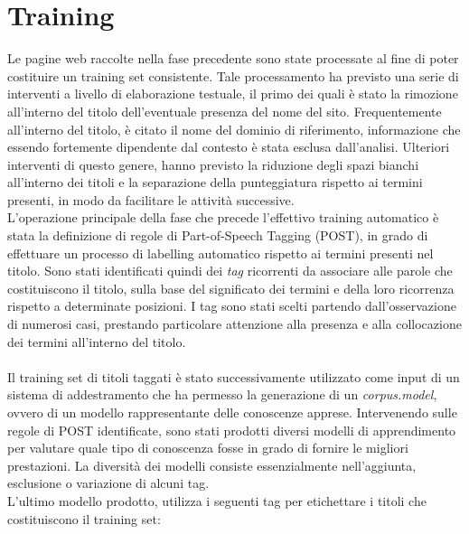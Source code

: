 \documentclass[a4paper]{report}
\begin{document}
\section{Training}
Le pagine web raccolte nella fase precedente sono state processate al fine di poter costituire un training set consistente. Tale processamento ha previsto una serie di interventi a livello di elaborazione testuale, il primo dei quali è stato la rimozione all'interno del titolo dell'eventuale presenza del nome del sito. Frequentemente all'interno del titolo, è citato il nome del dominio di riferimento, informazione che essendo fortemente dipendente dal contesto è stata esclusa dall'analisi. Ulteriori interventi di questo genere, hanno previsto la riduzione degli spazi bianchi all'interno dei titoli e la separazione della punteggiatura rispetto ai termini presenti, in modo da facilitare le attività successive. \\
L'operazione principale della fase che precede l'effettivo training automatico è stata la definizione di regole di Part-of-Speech Tagging (POST), in grado di effettuare un processo di labelling automatico rispetto ai termini presenti nel titolo. Sono stati identificati quindi dei \textit{tag} ricorrenti da associare alle parole che costituiscono il titolo, sulla base del significato dei termini e della loro ricorrenza rispetto a determinate posizioni. I tag sono stati scelti partendo dall'osservazione di numerosi casi, prestando particolare attenzione alla presenza e alla collocazione dei termini all'interno del titolo. \\ \\
Il training set di titoli taggati è stato successivamente utilizzato come input di un sistema di addestramento che ha permesso la generazione di un \textit{corpus.model}, ovvero di un modello rappresentante delle conoscenze apprese. Intervenendo sulle regole di POST identificate, sono stati prodotti diversi modelli di apprendimento per valutare quale tipo di conoscenza fosse in grado di fornire le migliori prestazioni. La diversità dei modelli consiste essenzialmente nell'aggiunta, esclusione o variazione di alcuni tag. \\
L'ultimo modello prodotto, utilizza i seguenti tag per etichettare i titoli che costituiscono il training set: 
\\ \\ 
\end{document}
